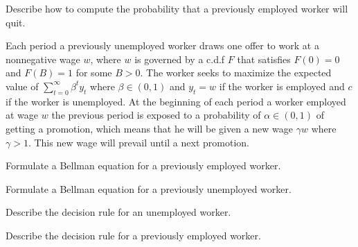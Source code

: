 \medskip
{} Describe how to compute the probability that a previously employed worker will quit.



\medskip
{} 
\medskip
\noindent Each period a previously unemployed worker draws one offer to work at a nonnegative wage $w$, where $w$ is governed by
a c.d.f $F$ that satisfies $F(0)= 0$ and $F(B) = 1$ for some $B >0$. The worker seeks to maximize the expected value
of $\sum_{t=0}^\infty \beta^t y_t$ where $\beta \in (0,1)$ and  $y_t =w$ if the worker is employed and $c$ if the worker is unemployed.
At the beginning of each period a worker employed at wage $w$ the previous period is exposed to a probability of
$\alpha \in (0,1)$ of getting a promotion, which means that he will be given a new wage $\gamma w$ where $\gamma > 1$. This new wage
will prevail until a next promotion.

\medskip
{}  Formulate a Bellman equation for a previously  employed worker.

\medskip

 Formulate a Bellman equation for a previously unemployed worker.

\medskip
{} Describe the decision rule for an unemployed worker.

\medskip
{} Describe the decision rule for  a previously employed worker.


